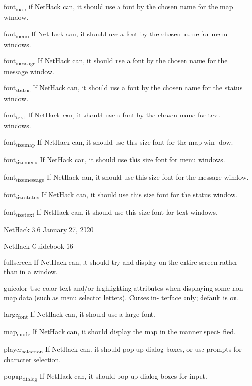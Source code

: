 \documentclass[11pt]{article}
\begin{document}
font\textsubscript{map}
 if NetHack can, it should use a font by the chosen name for the
 map window.

font\textsubscript{menu}
 If NetHack can, it should use a font by the chosen name for
 menu windows.

font\textsubscript{message}
 If NetHack can, it should use a font by the chosen name for the
 message window.

font\textsubscript{status}
 If NetHack can, it should use a font by the chosen name for the
 status window.

font\textsubscript{text}
 If NetHack can, it should use a font by the chosen name for
 text windows.

font\textsubscript{size}\textsubscript{map}
 If NetHack can, it should use this size font for the map win-
 dow.

font\textsubscript{size}\textsubscript{menu}
 If NetHack can, it should use this size font for menu windows.

font\textsubscript{size}\textsubscript{message}
 If NetHack can, it should use this size font for the message
 window.

font\textsubscript{size}\textsubscript{status}
 If NetHack can, it should use this size font for the status
 window.

font\textsubscript{size}\textsubscript{text}
 If NetHack can, it should use this size font for text windows.


NetHack 3.6                   January 27, 2020





NetHack Guidebook                       66



fullscreen
 If NetHack can, it should try and display on the entire screen
 rather than in a window.

guicolor
 Use color text and/or highlighting attributes when displaying
 some non-map data (such as menu selector letters). Curses in-
 terface only; default is on.

large\textsubscript{font}
 If NetHack can, it should use a large font.

map\textsubscript{mode}
 If NetHack can, it should display the map in the manner speci-
 fied.

player\textsubscript{selection}
 If NetHack can, it should pop up dialog boxes, or use prompts
 for character selection.

popup\textsubscript{dialog}
 If NetHack can, it should pop up dialog boxes for input.
\end{document}
